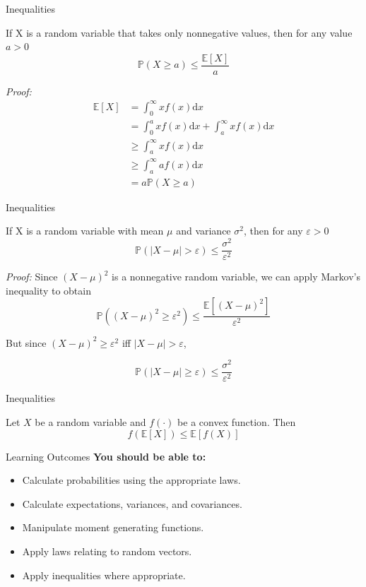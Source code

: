 \documentclass[11pt, xcolor={dvipsnames}, hyperref={colorlinks, allcolors=Blue}]{beamer}
\newcommand\bc[1]{{\usebeamercolor[fg]{frametitle} {\textbf{#1}}}} %
\renewcommand{\P}{\mathbb{P}}
\newcommand{\E}{\mathbb{E}}
\renewcommand{\epsilon}{\varepsilon}
\begin{document}
\begin{frame}{Inequalities}

\begin{theorem}
If X is a random variable that takes only nonnegative values, then for any value $a > 0$
\[\P(X \geq a) \leq \frac{\E[X]}{a}\]
\end{theorem}

\textit{Proof:}
\begin{align*}
\E[X] &= \int_{0}^{\infty} x f(x)\mathrm{d}x\\
& = \int_{0}^{a}xf(x)\mathrm{d}x + \int_{a}^{\infty}xf(x)\mathrm{d}x\\
&\geq \int_{a}^{\infty}xf(x)\mathrm{d}x\\
&\geq \int_{a}^{\infty}af(x)\mathrm{d}x\\
&= a \P(X \geq a)
\end{align*}

\end{frame}

\begin{frame}{Inequalities}

\begin{theorem}
If X is a random variable with mean $\mu$ and variance $\sigma^{2}$, then for any $\epsilon > 0$
\[\P(|X - \mu| > \epsilon) \leq \frac{\sigma^{2}}{\epsilon^{2}}\]
\end{theorem}
\textit{Proof:}
Since $(X - \mu)^{2}$ is a nonnegative random variable, we can apply Markov's inequality to obtain
\[\P\left( (X - \mu)^{2} \geq \epsilon^{2}\right) \leq \frac{\E[(X - \mu)^{2}]}{\epsilon^{2}}\]

But since $(X - \mu)^{2} \geq \epsilon^{2}$ iff $|X - \mu| > \epsilon$, 

\[\P(|X-\mu|\geq\epsilon) \leq \frac{\sigma^{2}}{\epsilon^{2}}\]

\end{frame}
\begin{frame}{Inequalities}

\begin{theorem}
Let $X$ be a random variable and $f(\cdot)$ be a convex function. Then
\[f(\E[X]) \leq \E[f(X)]\]
\end{theorem}

\vfill\vfill
\end{frame}
\begin{frame}{Learning Outcomes}
\bc{You should be able to:}
\begin{itemize}
	\item Calculate probabilities using the appropriate laws.
	\item Calculate expectations, variances, and covariances.
	\item Manipulate moment generating functions.
	\item Apply laws relating to random vectors.
	\item Apply inequalities where appropriate.
\end{itemize}
\end{frame}
\end{document}
